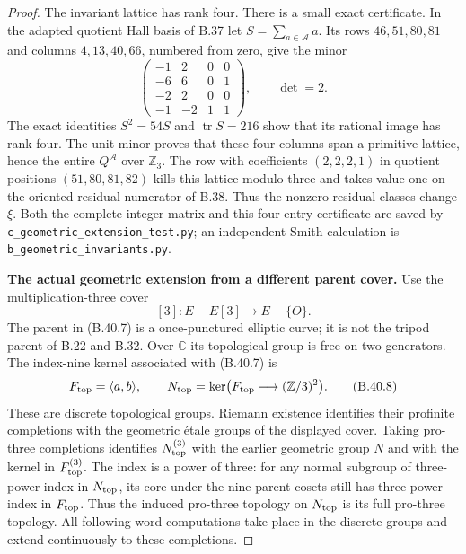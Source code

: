 \begin{proof}
The invariant lattice has rank four. There is a small
exact certificate. In the adapted quotient Hall basis
of B.37 let $S=\sum_{a\in\mathcal A}a$.
Its rows $46,51,80,81$ and columns $4,13,40,66$, numbered
from zero, give the minor
\[
 \begin{pmatrix}
 -1&2&0&0\\ -6&6&0&1\\ -2&2&0&0\\ -1&-2&1&1
 \end{pmatrix},\qquad \det=2.                                 \tag{B.40.6}
\]
The exact identities $S^2=54S$ and
$\operatorname{tr}S=216$ show that its rational image
has rank four. The unit minor proves that these four
columns span a primitive lattice, hence the entire
$Q^{\mathcal A}$ over $\mathbb Z_3$.
The row with coefficients $(2,2,2,1)$ in quotient
positions $(51,80,81,82)$ kills this lattice modulo
three and takes value one on the oriented residual
numerator of B.38. Thus the nonzero residual classes
change $\xi$.
Both the complete integer matrix and this four-entry
certificate are saved by
\texttt{c\_\allowbreak geometric\_\allowbreak extension\_\allowbreak test.py}; an independent
Smith calculation is
\texttt{b\_\allowbreak geometric\_\allowbreak invariants.py}.

\par\smallskip\noindent\textbf{The actual geometric extension from a different parent cover.}\enspace 
Use the multiplication-three cover
\[
                [3]:E-E[3]\longrightarrow E-\{O\}.           \tag{B.40.7}
\]
The parent in (B.40.7) is a once-punctured elliptic curve;
it is not the tripod parent of B.22 and B.32.
Over $\mathbb C$ its topological group is free on two
generators. The index-nine kernel associated with (B.40.7)
is
\[
 F_{\rm top}=\langle a,b\rangle,\qquad
 N_{\rm top}=\ker\bigl(F_{\rm top}\longrightarrow(\mathbb Z/3)^2\bigr).
                                                               \tag{B.40.8}
\]
These are discrete topological groups. Riemann existence
identifies their profinite completions with the geometric
\'{e}tale groups of the displayed cover. Taking pro-three
completions identifies $N_{\rm top}^{(3)}$ with the earlier
geometric group $N$ and with the kernel in
$F_{\rm top}^{(3)}$. The index is a power of three:
for any normal subgroup of three-power index in
$N_{\rm top}$, its core under the nine parent cosets
still has three-power index in $F_{\rm top}$.
Thus the induced pro-three topology on $N_{\rm top}$
is its full pro-three topology. All following word
computations take place in the discrete groups and
extend continuously to these completions.


\end{proof}
